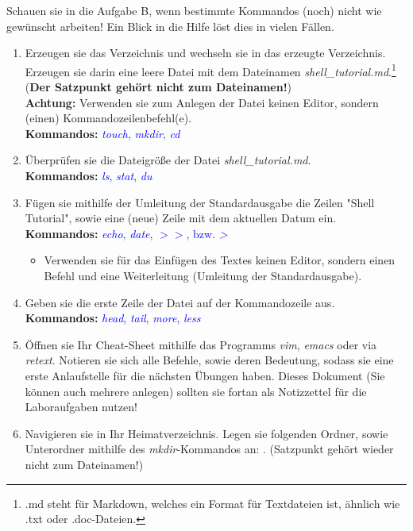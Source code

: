 \documentclass[paper=a4,fontsize=11pt]{scrartcl}%
\numberwithin{equation}{section}
\begin{document}
\begin{enumerate}
  Schauen sie in die Aufgabe B, wenn bestimmte Kommandos (noch) nicht wie gewünscht arbeiten! Ein Blick in die Hilfe löst dies in vielen Fällen.
  	\begin{enumerate}[label=(\alph*)]
  		\item Erzeugen sie das Verzeichnis  und wechseln sie in das erzeugte Verzeichnis. Erzeugen sie darin eine leere Datei mit dem Dateinamen \textit{shell\_tutorial.md}.\footnote{.md steht für Markdown, welches ein Format für Textdateien ist, ähnlich wie .txt oder .doc-Dateien.} (\textbf{Der Satzpunkt gehört nicht zum Dateinamen!})\\
        \textbf{Achtung:} Verwenden sie zum Anlegen der Datei keinen Editor, sondern (einen) Kommandozeilenbefehl(e).\\
        \textbf{Kommandos:} \textcolor{blue}{\emph{touch}, \emph{mkdir}, \emph{cd}}
		\item Überprüfen sie die Dateigröße der Datei \textit{shell\_tutorial.md}.\\
		\textbf{Kommandos:} \textcolor{blue}{\emph{ls}, \emph{stat}, \emph{du}}
		\item Fügen sie mithilfe der Umleitung der Standardausgabe die Zeilen "Shell Tutorial", sowie eine (neue) Zeile mit dem aktuellen Datum ein.\\
		\textbf{Kommandos:} \textcolor{blue}{\emph{echo}, \emph{date}, $>>$, bzw. \emph{>}}
		\begin{itemize}
			\item \small Verwenden sie für das Einfügen des Textes keinen Editor, sondern einen Befehl und eine Weiterleitung (Umleitung der Standardausgabe).
		\end{itemize}
		\item Geben sie die erste Zeile der Datei auf der Kommandozeile aus.\\
		\textbf{Kommandos:} \textcolor{blue}{\emph{head}, \emph{tail}, \emph{more}, \emph{less}}
		\item Öffnen sie Ihr Cheat-Sheet mithilfe das Programms \emph{vim}, \emph{emacs} oder via \emph{retext}. Notieren sie sich alle Befehle, sowie deren Bedeutung, sodass sie eine erste Anlaufstelle für die nächsten Übungen haben. Dieses Dokument (Sie können auch mehrere anlegen) sollten sie fortan als Notizzettel für die Laboraufgaben nutzen!
		\item Navigieren sie in Ihr Heimatverzeichnis. Legen sie folgenden Ordner, sowie Unterordner mithilfe des \emph{mkdir}-Kommandos an: . (Satzpunkt gehört wieder nicht zum Dateinamen!)

\end{enumerate}
\end{enumerate}
\end{document}

